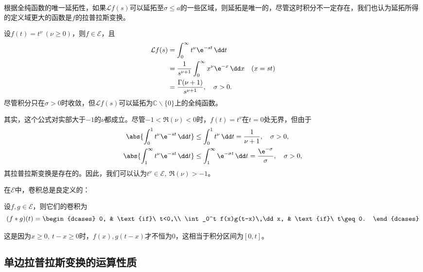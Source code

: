 根据全纯函数的唯一延拓性，如果$\mathcal{L}f(s)$可以延拓至$\sigma\leq a$的一些区域，则延拓是唯一的，尽管这时积分不一定存在，我们也认为延拓所得的定义域更大的函数是$f$的拉普拉斯变换。
\begin{example}[多项式的拉普拉斯变换]
    设$f(t)=t^\nu\ (\nu\geq 0)$，则$f\in\mathcal{E}$，且
    \begin{align}
        \mathcal{L}f(s)&=\int_0^{\infty}t^\nu \e^{-st}\,\dd t\nonumber\\
        &=\frac{1}{s^{\nu+1}}\int_0^{\infty}x^\nu \e^{-x}\,\dd x&(x=st)\nonumber\\
        &=\frac{\Gamma(\nu+1)}{s^{\nu+1}},\quad \sigma>0.
    \end{align}
    尽管积分只在$\sigma>0$时收敛，但$\mathcal{L}f(s)$可以延拓为$\mathbb{C}\backslash\{0\}$上的全纯函数。
    \begin{remark}
        其实，这个公式对实部大于$-1$的$\nu$都成立。尽管$-1<\Re(\nu)<0$时，$f(t)=t^\nu$在$t=0$处无界，但由于
        \begin{align}
            \abs{\int_{0}^{1}t^{\nu}\e^{-st}\,\dd t}&\leq \int_0^1 t^\nu\,\dd t=\frac{1}{\nu+1},\quad \sigma>0,\\
            \abs{\int_{1}^{\infty}t^{\nu}\e^{-st}\,\dd t}&\leq \int_1^\infty \e^{-\sigma t}\,\dd t=\frac{\e^{-\sigma}}{\sigma},\quad \sigma>0,
        \end{align}
        其拉普拉斯变换是存在的。因此，我们可以认为$t^\nu\in\mathcal{E},\ \Re(\nu)>-1$。
    \end{remark}
\end{example}

在$\mathcal{E}$中，卷积总是良定义的：
\begin{proposition}
    设$f,g\in\mathcal{E}$，则它们的卷积为
    \begin{equation}
        (f*g)(t)=\begin{dcases}
            0, & \text{if}\ t<0,\\
            \int_0^t f(x)g(t-x)\,\dd x, & \text{if}\ t\geq 0.
        \end{dcases}
    \end{equation}
\end{proposition}
这是因为$x\geq 0,\ t-x\geq 0$时，$f(x),g(t-x)$才不恒为$0$，这相当于积分区间为$[0,t]$。

\subsection{单边拉普拉斯变换的运算性质}\label{sub:laplace_operation}

